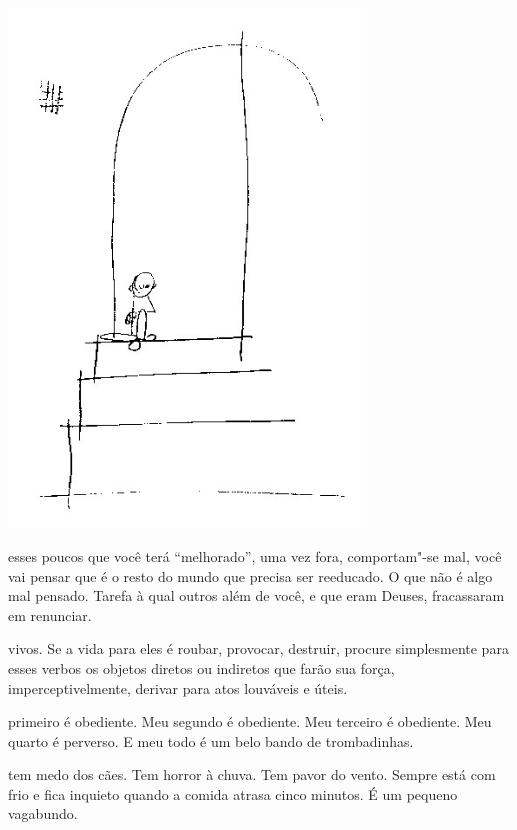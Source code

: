 \begin{vplace}[.50]
\begin{center}
\includegraphics[width=95mm]{./imgs/Image_11.jpg}
\end{center}
\end{vplace}

\pagebreak
\thispagestyle{empty}

\movetooddpage

 esses poucos que você terá ``melhorado'', uma vez fora, comportam"-se
mal, você vai pensar que é o resto do mundo que precisa ser reeducado.
O que não é algo mal pensado. Tarefa à qual outros além de você, e que
eram Deuses, fracassaram em renunciar.



 vivos. Se a vida para eles é roubar, provocar, destruir,
procure simplesmente para esses verbos os objetos diretos ou indiretos
que farão sua força, imperceptivelmente, derivar para atos louváveis e
úteis.



 primeiro é obediente. Meu segundo é obediente. Meu terceiro é
obediente. Meu quarto é perverso. E meu todo é um belo bando de
trombadinhas.



 tem medo dos cães. Tem horror à chuva. Tem pavor do vento. Sempre
está com frio e fica inquieto quando a comida atrasa cinco minutos. É um
pequeno vagabundo.



